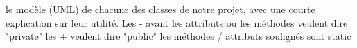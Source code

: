 le modèle (UML) de chacune des classes de notre projet, avec une courte explication sur leur utilité.
Les - avant les attributs ou les méthodes veulent dire "private"
les + veulent dire "public"
les méthodes / attributs soulignés sont static 
